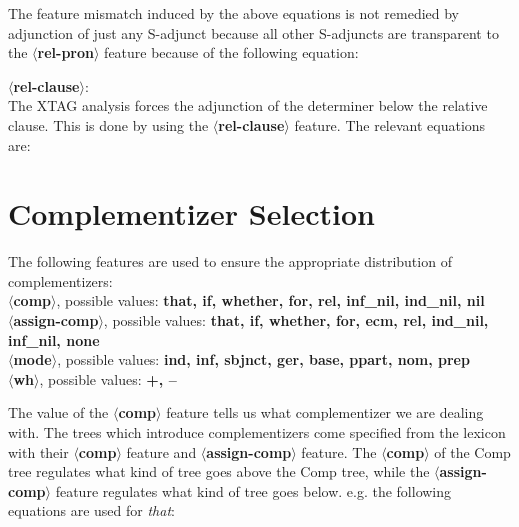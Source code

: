 

The feature mismatch induced by the above equations
is not remedied by adjunction of just any S-adjunct
because all other S-adjuncts
are transparent to the {\bf $\langle$rel-pron$\rangle$} feature
because of the following equation:


\noindent
{\bf $\langle$rel-clause$\rangle$}:\\ The XTAG analysis forces the
adjunction of the determiner below the relative clause. This is done
by using the {\bf $\langle$rel-clause$\rangle$} feature. The relevant
equations are:





\section{Complementizer Selection}
The following features are used to ensure the appropriate distribution
of complementizers:
\\
{\bf $\langle$comp$\rangle$}, possible values: {\bf that, if, whether,
for, rel, inf\_nil, ind\_nil, nil}\\
{\bf $\langle$assign-comp$\rangle$}, possible values: {\bf that, if,
whether, for, ecm, rel, ind\_nil, inf\_nil, none}\\
{\bf $\langle$mode$\rangle$}, possible values: {\bf ind, inf, sbjnct, ger, base, ppart, 
nom, prep}\\
{\bf $\langle$wh$\rangle$}, possible values: {\bf +, --}

The value of the {\bf $\langle$comp$\rangle$} feature tells us what complementizer we 
are dealing with. The trees which introduce complementizers come 
specified from the lexicon with their 
{\bf $\langle$comp$\rangle$} feature and {\bf $\langle$assign-comp$\rangle$} 
feature. The {\bf $\langle$comp$\rangle$} of the Comp tree regulates 
what kind of tree goes above the Comp tree, while the 
{\bf $\langle$assign-comp$\rangle$} feature regulates what kind of tree
goes below.
e.g.
the following equations are used for {\em that}:


